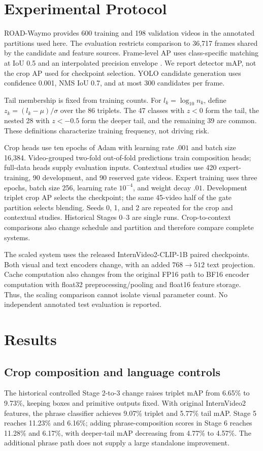 \documentclass[11pt,letterpaper]{article}
\begin{document}
\section{Experimental Protocol}
ROAD-Waymo provides 600 training and 198 validation videos in the annotated partitions used here. The evaluation restricts comparison to 36,717 frames shared by the candidate and feature sources. Frame-level AP uses class-specific matching at IoU 0.5 and an interpolated precision envelope \cite{voc}. We report detector mAP, not the crop AP used for checkpoint selection. YOLO candidate generation uses confidence 0.001, NMS IoU 0.7, and at most 300 candidates per frame.

Tail membership is fixed from training counts. For $l_k=\log_{10}n_k$, define $z_k=(l_k-\mu)/\sigma$ over the 86 triplets. The 47 classes with $z<0$ form the tail, the nested 28 with $z<-0.5$ form the deeper tail, and the remaining 39 are common. These definitions characterize training frequency, not driving risk.

Crop heads use ten epochs of Adam with learning rate $.001$ and batch size 16,384. Video-grouped two-fold out-of-fold predictions train composition heads; full-data heads supply evaluation inputs. Contextual studies use 420 expert-training, 90 development, and 90 reserved gate videos. Expert training uses three epochs, batch size 256, learning rate $10^{-4}$, and weight decay $.01$. Development triplet crop AP selects the checkpoint; the same 45-video half of the gate partition selects blending. Seeds 0, 1, and 2 are repeated for the crop and contextual studies. Historical Stages 0--3 are single runs. Crop-to-context comparisons also change schedule and partition and therefore compare complete systems.

The scaled system uses the released InternVideo2-CLIP-1B paired checkpoints. Both visual and text encoders change, with an added $768\rightarrow512$ text projection. Cache computation also changes from the original FP16 path to BF16 encoder computation with float32 preprocessing/pooling and float16 feature storage. Thus, the scaling comparison cannot isolate visual parameter count. No independent annotated test evaluation is reported.

\section{Results}
\subsection{Crop composition and language controls}
The historical controlled Stage 2-to-3 change raises triplet mAP from 6.65\% to 9.73\%, keeping boxes and primitive outputs fixed. With original InternVideo2 features, the phrase classifier achieves 9.07\% triplet and 5.77\% tail mAP. Stage 5 reaches 11.23\% and 6.16\%; adding phrase-composition scores in Stage 6 reaches 11.28\% and 6.17\%, with deeper-tail mAP decreasing from 4.77\% to 4.57\%. The additional phrase path does not supply a large standalone improvement.
\end{document}
